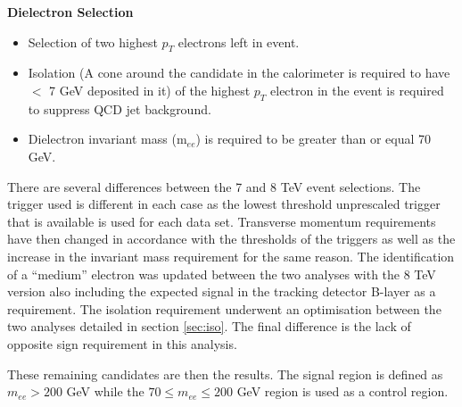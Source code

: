 	{\bf Dielectron Selection}
	\begin{itemize}
	\item Selection of two highest $p_{T}$ electrons left in event.
	\item Isolation (A cone around the candidate in the calorimeter is required to have $<$ 7 GeV deposited in it) of the highest $p_{T}$ electron in the event is required to suppress QCD jet background. 
	\item Dielectron invariant mass (m$_{ee}$) is required to be greater than or equal 70 GeV.
	\end{itemize}

	There are several differences between the 7 and 8 TeV event selections. The trigger used is different in each case as the lowest threshold unprescaled trigger that is available is used for each data set. Transverse momentum requirements have then changed in accordance with the thresholds of the triggers as well as the increase in the invariant mass requirement for the same reason. The identification of a ``medium'' electron was updated between the two analyses with the 8 TeV version also including the expected signal in the tracking detector B-layer as a requirement. The isolation requirement underwent an optimisation between the two analyses detailed in section \ref{sec:iso}. The final difference is the lack of opposite sign requirement in this analysis.

	These remaining candidates are then the results. The signal region is defined as $m_{ee} > 200$ GeV while the $70 \leq m_{ee} \leq 200$ GeV region is used as a control region.

